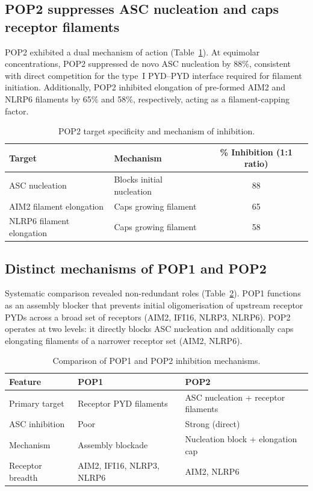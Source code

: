 \documentclass[12pt]{article}
\begin{document}
\subsection{POP2 suppresses ASC nucleation and caps receptor filaments}

POP2 exhibited a dual mechanism of action (Table~\ref{tab:pop2}). At equimolar concentrations, POP2 suppressed de novo ASC nucleation by 88\%, consistent with direct competition for the type~I PYD--PYD interface required for filament initiation. Additionally, POP2 inhibited elongation of pre-formed AIM2 and NLRP6 filaments by 65\% and 58\%, respectively, acting as a filament-capping factor.

\begin{table}[ht]
\centering
\caption{POP2 target specificity and mechanism of inhibition.}
\label{tab:pop2}
\begin{tabular}{llc}
\toprule
Target & Mechanism & \% Inhibition (1:1 ratio) \\
\midrule
ASC nucleation & Blocks initial nucleation & 88 \\
AIM2 filament elongation & Caps growing filament & 65 \\
NLRP6 filament elongation & Caps growing filament & 58 \\
\bottomrule
\end{tabular}
\end{table}

\subsection{Distinct mechanisms of POP1 and POP2}

Systematic comparison revealed non-redundant roles (Table~\ref{tab:comparison}). POP1 functions as an assembly blocker that prevents initial oligomerisation of upstream receptor PYDs across a broad set of receptors (AIM2, IFI16, NLRP3, NLRP6). POP2 operates at two levels: it directly blocks ASC nucleation and additionally caps elongating filaments of a narrower receptor set (AIM2, NLRP6).

\begin{table}[ht]
\centering
\caption{Comparison of POP1 and POP2 inhibition mechanisms.}
\label{tab:comparison}
\begin{tabular}{lll}
\toprule
Feature & POP1 & POP2 \\
\midrule
Primary target & Receptor PYD filaments & ASC nucleation + receptor filaments \\
ASC inhibition & Poor & Strong (direct) \\
Mechanism & Assembly blockade & Nucleation block + elongation cap \\
Receptor breadth & AIM2, IFI16, NLRP3, NLRP6 & AIM2, NLRP6 \\
\bottomrule
\end{tabular}
\end{table}
\end{document}
